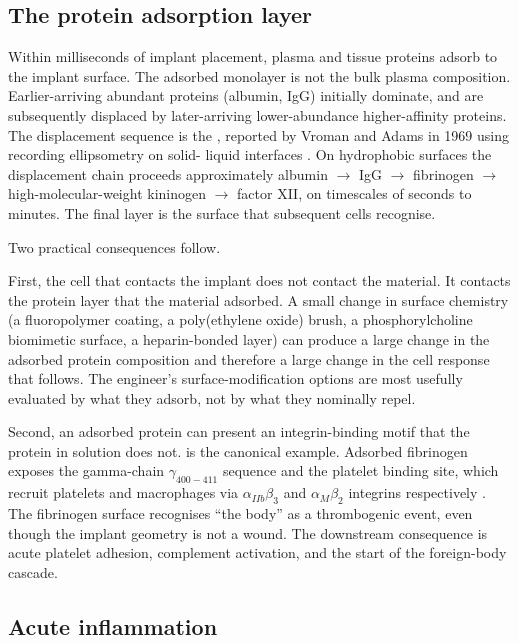 \subsection{The protein adsorption layer}

Within milliseconds of implant placement, plasma and tissue
proteins adsorb to the implant surface. The adsorbed monolayer is
not the bulk plasma composition. Earlier-arriving abundant proteins
(albumin, IgG) initially dominate, and are subsequently displaced
by later-arriving lower-abundance higher-affinity proteins. The
displacement sequence is the , reported by
Vroman and Adams in 1969 using recording ellipsometry on solid-
liquid interfaces \cite{paper:v6c12-vroman-effect-1969}. On
hydrophobic surfaces the displacement chain proceeds approximately
albumin $\to$ IgG $\to$ fibrinogen $\to$ high-molecular-weight
kininogen $\to$ factor XII, on timescales of seconds to minutes.
The final layer is the surface that subsequent cells recognise.

Two practical consequences follow.

First, the cell that contacts the implant does not contact the
material. It contacts the protein layer that the material adsorbed.
A small change in surface chemistry (a fluoropolymer coating, a
poly(ethylene oxide) brush, a phosphorylcholine biomimetic surface,
a heparin-bonded layer) can produce a large change in the adsorbed
protein composition and therefore a large change in the cell
response that follows. The engineer's surface-modification options
are most usefully evaluated by what they adsorb, not by what they
nominally repel.

Second, an adsorbed protein can present an integrin-binding motif
that the protein in solution does not.  is the
canonical example. Adsorbed fibrinogen exposes the gamma-chain
$\gamma_{400-411}$ sequence and the platelet binding site, which
recruit platelets and macrophages via $\alpha_{IIb}\beta_3$ and
$\alpha_M\beta_2$ integrins respectively
\cite{paper:v6c12-mosesson-fibrinogen-2005}. The fibrinogen surface
recognises ``the body'' as a thrombogenic event, even though the
implant geometry is not a wound. The downstream consequence is
acute platelet adhesion, complement activation, and the start of
the foreign-body cascade.

\subsection{Acute inflammation}

